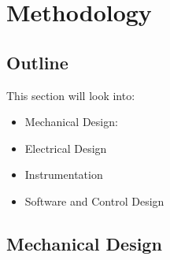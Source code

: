 \section{Methodology}
\subsection{Outline}
This section will look into:
\begin{itemize}
	\item Mechanical Design:
	\item Electrical Design
	\item Instrumentation
	\item Software and Control Design
\end{itemize}

\subsection{Mechanical Design}
